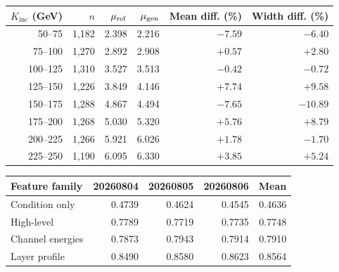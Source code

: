 \documentclass[11pt]{article}
\newcommand{\Kinc}{K_{\mathrm{inc}}}
\begin{document}
\begin{center}
\begin{minipage}{\linewidth}
\centering
{}
\label{tab:energy_bins}
\small
\begin{tabular}{@{}rrrrrr@{}}
\toprule
$\Kinc$ (GeV) & $n$ & $\mu_{\rm ref}$ & $\mu_{\rm gen}$ & Mean diff. (\%) & Width diff. (\%) \\
\midrule
50--75 & 1,182 & 2.398 & 2.216 & $-7.59$ & $-6.40$ \\
75--100 & 1,270 & 2.892 & 2.908 & $+0.57$ & $+2.80$ \\
100--125 & 1,310 & 3.527 & 3.513 & $-0.42$ & $-0.72$ \\
125--150 & 1,226 & 3.849 & 4.146 & $+7.74$ & $+9.58$ \\
150--175 & 1,288 & 4.867 & 4.494 & $-7.65$ & $-10.89$ \\
175--200 & 1,268 & 5.030 & 5.320 & $+5.76$ & $+8.79$ \\
200--225 & 1,266 & 5.921 & 6.026 & $+1.78$ & $-1.70$ \\
225--250 & 1,190 & 6.095 & 6.330 & $+3.85$ & $+5.24$ \\
\bottomrule
\end{tabular}
\end{minipage}
\end{center}

\begin{center}
\begin{minipage}{\linewidth}
\centering
{}
\label{tab:classifier_seeds}
\small
\begin{tabular}{@{}lrrrr@{}}
\toprule
Feature family & 20260804 & 20260805 & 20260806 & Mean \\
\midrule
Condition only & 0.4739 & 0.4624 & 0.4545 & 0.4636 \\
High-level & 0.7789 & 0.7719 & 0.7735 & 0.7748 \\
Channel energies & 0.7873 & 0.7943 & 0.7914 & 0.7910 \\
Layer profile & 0.8490 & 0.8580 & 0.8623 & 0.8564 \\
\bottomrule
\end{tabular}
\end{minipage}
\end{center}
\end{document}
